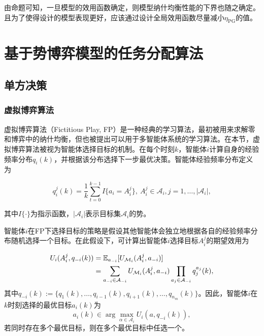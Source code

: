 由命题可知，一旦模型的效用函数确定，则模型纳什均衡性能的下界也随之确定。且为了使得设计的模型表现更好，应该通过设计全局效用函数尽量减小$\eta_{\text{PG}}$的值。

\section{基于势博弈模型的任务分配算法}
\label{pg:pgta}
\subsection{单方决策}
\label{pg:pgta:protocal}

\subsubsection{虚拟博弈算法}
\label{pgta:protocal:FP}
虚拟博弈算法（Fictitious Play, FP）是一种经典的学习算法，最初被用来求解零和博弈中的纳什均衡，但也被提出可以用于多智能体系统的学习算法。在本节，虚拟博弈算法被视为智能体选择目标的机制。在每个时刻$k$，智能体$i$计算自身的经验频率分布$q_i(k)$，并根据该分布选择下一步最优决策。智能体经验频率分布定义为

\begin{equation}
\label{pg:eq:frequency}
	q_i^j(k) = \frac{1}{k} \sum_{t=0}^{k-1} I\{a_i = A_i^j\},\ A_i^j \in \mathcal{A}_i, j = 1,\dots,|\mathcal{A}_i|,
\end{equation}

其中$I\{\cdot\}$为指示函数，$|\mathcal{A}_i|$表示目标集$\mathcal{A}_i$的势。

智能体$i$在FP下选择目标的策略是假设其他智能体会独立地根据各自的经验频率分布随机选择一个目标。在此假设下，可计算出智能体$i$选择目标$A_i^j$的期望效用为

\begin{align}
\label{pg:eq:expectU}
	U_i(A_i^j, q_{-i}(k)) &= \mathbb{E}_{a_{-i}}[U_{\mathcal{M}_i}(A_i^j,a_{-i})]\notag\\
	&= \sum_{a_{-i}\in \mathcal{A}_{-i}} U_{\mathcal{M}_i}(A_i^j, a_{-i}) \prod_{a_j \in \mathcal{A}_{-i}} q_j^{a_j}(k),
\end{align}
其中$q_{-i}(k):=\{q_1(k),\dots,q_{i-1}(k),q_{i+1}(k),\dots,q_{n_m}(k)\}$。因此，智能体$i$在$k$时刻选择的最优目标$a_i(k)$为
\begin{equation}
\label{pg:eq:bestResponse}
	a_i(k) \in \arg \max_{\alpha \in \mathcal{A}_i} U_i(a, q_{-i}(k)),
\end{equation}
若同时存在多个最优目标，则在多个最优目标中任选一个。

